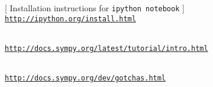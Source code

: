 {[ Installation instructions for \texttt{ipython notebook} ] \\ 
\href{http://ipython.org/install.html}{\texttt{http://ipython.org/install.html}}

\medskip
{} \\ 
\href{http://docs.sympy.org/latest/tutorial/intro.html}{\texttt{http://docs.sympy.org/latest/tutorial/intro.html}}

\medskip
{} \\ 
\href{http://docs.sympy.org/dev/gotchas.html}{\texttt{http://docs.sympy.org/dev/gotchas.html}}



}











